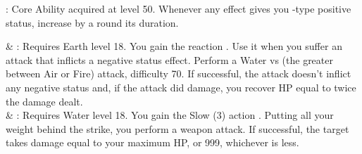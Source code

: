 \begin{ffminipage}
\noindent{}: Core Ability acquired at level 50. Whenever any effect gives you -type positive status, increase by a round its duration. \pc

\begin{jobspec}
 & %
: Requires Earth level 18. You gain the reaction . Use it when you suffer an attack that inflicts a negative status effect. Perform a Water vs (the greater between Air or Fire) attack, difficulty 70. If successful, the attack doesn’t inflict any negative status and, if the attack did damage, you recover HP equal to twice the damage dealt. \\
 & %
: Requires Water level 18. You gain the Slow (3)  action . Putting all your weight behind the strike, you perform a weapon attack. If successful, the target takes damage equal to your maximum HP, or 999, whichever is less. \\
\end{jobspec}
\end{ffminipage}
